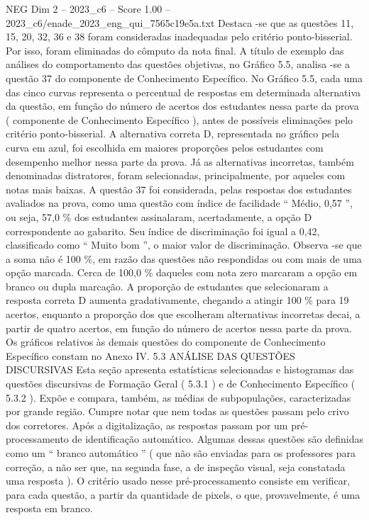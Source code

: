 \begin{textsample}{NEG Dim 2 – 2023\_c6 – Score 1.00 – 2023\_c6/enade\_2023\_eng\_qui\_7565c19e5a.txt}
Destaca -se que as questões 11, 15, 20, 32, 36 e 38 foram consideradas inadequadas pelo critério ponto-bisserial.
Por isso, foram eliminadas do cômputo da nota final.
A título de exemplo das análises do comportamento das questões objetivas, no Gráfico 5.5, analisa -se a questão 37 do componente de Conhecimento Específico.
No Gráfico 5.5, cada uma das cinco curvas representa o percentual de respostas em determinada alternativa da questão, em função do número de acertos dos estudantes nessa parte da prova ( componente de Conhecimento Específico ), antes de possíveis eliminações pelo critério ponto-bisserial.
A alternativa correta D, representada no gráfico pela curva em azul, foi escolhida em maiores proporções pelos estudantes com desempenho melhor nessa parte da prova.
Já as alternativas incorretas, também denominadas distratores, foram selecionadas, principalmente, por aqueles com notas mais baixas.
A questão 37 foi considerada, pelas respostas dos estudantes avaliados na prova, como uma questão com índice de facilidade “ Médio, 0,57 ”, ou seja, 57,0 \% dos estudantes assinalaram, acertadamente, a opção D correspondente ao gabarito.
Seu índice de discriminação foi igual a 0,42, classificado como “ Muito bom ”, o maior valor de discriminação.
Observa -se que a soma não é 100 \%, em razão das questões não respondidas ou com mais de uma opção marcada.
Cerca de 100,0 \% daqueles com nota zero marcaram a opção em branco ou dupla marcação.
A proporção de estudantes que selecionaram a resposta correta D aumenta gradativamente, chegando a atingir 100 \% para 19 acertos, enquanto a proporção dos que escolheram alternativas incorretas decai, a partir de quatro acertos, em função do número de acertos nessa parte da prova.
Os gráficos relativos às demais questões do componente de Conhecimento Específico constam no Anexo IV. 5.3 ANÁLISE DAS QUESTÕES DISCURSIVAS Esta seção apresenta estatísticas selecionadas e histogramas das questões discursivas de Formação Geral ( 5.3.1 ) e de Conhecimento Específico ( 5.3.2 ).
Expõe e compara, também, as médias de subpopulações, caracterizadas por grande região.
Cumpre notar que nem todas as questões passam pelo crivo dos corretores.
Após a digitalização, as respostas passam por um pré-processamento de identificação automático.
Algumas dessas questões são definidas como um “ branco automático ” ( que não são enviadas para os professores para correção, a não ser que, na segunda fase, a de inspeção visual, seja constatada uma resposta ).
O critério usado nesse pré-processamento consiste em verificar, para cada questão, a partir da quantidade de pixels, o que, provavelmente, é uma resposta em branco.

\end{textsample}
